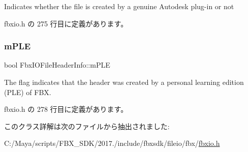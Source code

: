 Indicates whether the file is created by a genuine Autodesk plug-\/in or not 

 fbxio.\+h の 275 行目に定義があります。

\mbox{\label{class_fbx_i_o_file_header_info_a831142b96de2fe8c3da6009c4f596f5c}} 
\subsubsection{\texorpdfstring{m\+P\+LE}{mPLE}}
{\footnotesize\ttfamily bool Fbx\+I\+O\+File\+Header\+Info\+::m\+P\+LE}

The flag indicates that the header was created by a personal learning edition (P\+LE) of F\+BX. 

 fbxio.\+h の 278 行目に定義があります。



このクラス詳解は次のファイルから抽出されました\+:\begin{DoxyCompactItemize}
\item 
C\+:/\+Maya/scripts/\+F\+B\+X\+\_\+\+S\+D\+K/2017./include/fbxsdk/fileio/fbx/\hyperlink{fbxio_8h}{fbxio.\+h}\end{DoxyCompactItemize}
